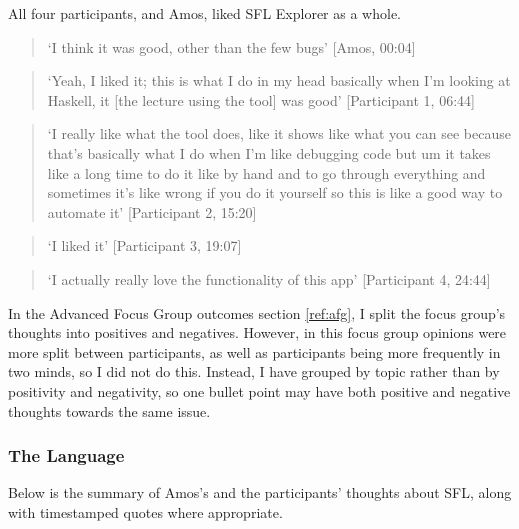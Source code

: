 All four participants, and Amos, liked SFL Explorer  as a whole. 
\noindent\begin{quotation}
\noindent`I think it was good, other than the few bugs' [Amos, 00:04]
\end{quotation}
\noindent\begin{quotation}
\noindent`Yeah, I liked it; this is what I do in my head basically when I'm looking at Haskell, it [the lecture using the tool] was good' [Participant 1, 06:44]
\end{quotation}
\noindent\begin{quotation}
\noindent`I really like what the tool does, like it
shows like what you can see because that's basically what I do when I'm like debugging code but
um it takes like a long time to do it like by hand and to go through everything and sometimes it's
like wrong if you do it yourself so this is like a good way to automate it' [Participant 2, 15:20]
\end{quotation}
\noindent\begin{quotation}
\noindent`I liked it' [Participant 3, 19:07]
\end{quotation}
\noindent\begin{quotation}
\noindent`I actually really love the functionality of this app' [Participant 4, 24:44]
\end{quotation}


\noindent In the Advanced Focus Group outcomes section \ref{ref:afg}, I split the focus group's thoughts into positives and negatives. However, in this focus group opinions were more split between participants, as well as participants being more frequently in two minds, so I did not do this. Instead, I have grouped by topic rather than by positivity and negativity, so one bullet point may have both positive and negative thoughts towards the same issue. 

\subsubsection{The Language}
Below is the summary of Amos's and the participants' thoughts about \ac{SFL}, along with timestamped quotes where appropriate.

